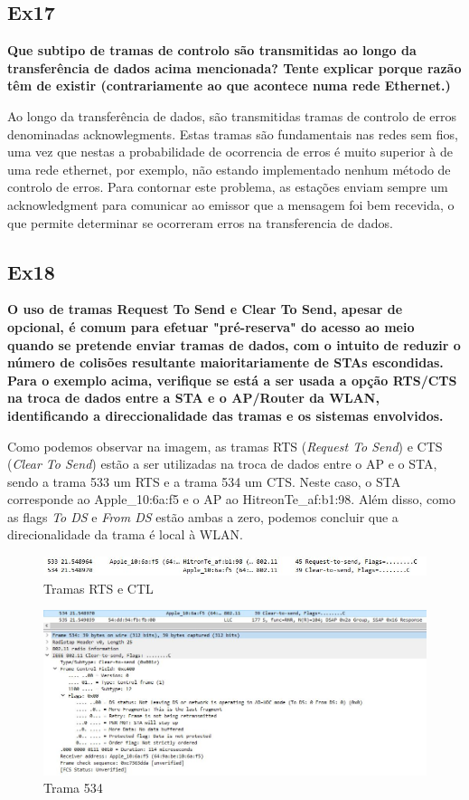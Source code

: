 \documentclass{article}
\begin{document}
\subsection{Ex17}
\textbf{Que subtipo de tramas de controlo são transmitidas ao longo da transferência de dados acima mencionada? Tente explicar porque razão têm de existir (contrariamente ao que acontece numa rede Ethernet.)}\\\par
Ao longo da transferência de dados, são transmitidas tramas de controlo de erros denominadas acknowlegments. Estas tramas são fundamentais nas redes sem fios, uma vez que nestas a probabilidade de ocorrencia de erros é muito superior à de uma rede ethernet, por exemplo, não estando implementado nenhum método de controlo de erros. Para contornar este problema, as estações enviam sempre um acknowledgment para comunicar ao emissor que a mensagem foi bem recevida, o que permite determinar se ocorreram erros na transferencia de dados.

\subsection{Ex18}
\textbf{O uso de tramas Request To Send e Clear To Send, apesar de opcional, é comum para efetuar "pré-reserva" do acesso ao meio quando se pretende enviar tramas de dados, com o intuito de reduzir o número de colisões resultante maioritariamente de STAs escondidas. Para o exemplo acima, verifique se está a ser usada a opção RTS/CTS na troca de dados entre a STA e o AP/Router da WLAN, identificando a direccionalidade das tramas e os sistemas envolvidos.}\\\par
Como podemos observar na imagem, as tramas RTS (\textit{Request To Send}) e CTS (\textit{Clear To Send}) estão a ser utilizadas na troca de dados entre o AP e o STA, sendo a trama 533 um RTS e a trama 534 um CTS. Neste caso, o STA corresponde ao Apple\_10:6a:f5 e o AP ao HitreonTe\_af:b1:98. Além disso, como as flags \textit{To DS} e \textit{From DS} estão ambas a zero, podemos concluir que a direcionalidade da trama é local à WLAN.
\newpage
\begin{figure}[h]
	\centering
	\includegraphics[scale = 0.6]{ex-18.JPG}
	\caption{Tramas RTS e CTL}
\end{figure}

\begin{figure}[h]
	\centering
	\includegraphics[scale = 0.5]{ex-18-trama534.JPG}
	\caption{Trama 534}
\end{figure}
\end{document}
